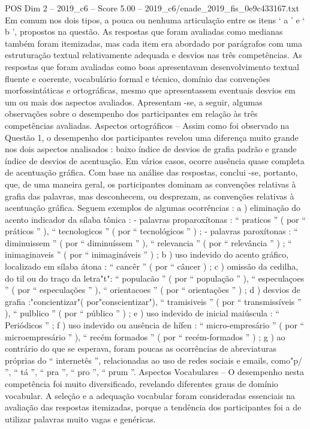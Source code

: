 \begin{textsample}{POS Dim 2 – 2019\_c6 – Score 5.00 – 2019\_c6/enade\_2019\_fis\_0e9c433167.txt}
Em comum nos dois tipos, a pouca ou nenhuma articulação entre os itens ‘ a ’ e ‘ b ’, propostos na questão.
As respostas que foram avaliadas como medianas também foram itemizadas, mas cada item era abordado por parágrafos com uma estruturação textual relativamente adequada e desvios nas três competências.
As respostas que foram avaliadas como boas apresentavam desenvolvimento textual fluente e coerente, vocabulário formal e técnico, domínio das convenções morfossintáticas e ortográficas, mesmo que apresentassem eventuais desvios em um ou mais dos aspectos avaliados.
Apresentam -se, a seguir, algumas observações sobre o desempenho dos participantes em relação às três competências avaliadas.
Aspectos ortográficos – Assim como foi observado na Questão 1, o desempenho dos participantes revelou uma diferença muito grande nos dois aspectos analisados : baixo índice de desvios de grafia padrão e grande índice de desvios de acentuação.
Em vários casos, ocorre ausência quase completa de acentuação gráfica.
Com base na análise das respostas, conclui -se, portanto, que, de uma maneira geral, os participantes dominam as convenções relativas à grafia das palavras, mas desconhecem, ou desprezam, as convenções relativas à acentuação gráfica.
Seguem exemplos de algumas ocorrências : a ) eliminação do acento indicador da sílaba tônica : - palavras proparoxítonas : “ praticos ” ( por “ práticos ” ), “ tecnologicos ” ( por “ tecnológicos ” ) ; - palavras paroxítonas : “ diminuissem ” ( por “ diminuíssem ” ), “ relevancia ” ( por “ relevância ” ) ; “ inimaginaveis ” ( por “ inimagináveis ” ) ; b ) uso indevido do acento gráfico, localizado em sílaba átona : “ cancêr ” ( por “ câncer ) ; c ) omissão da cedilha, do til ou do traço da letra"t": “ populacão ” ( por “ população ” ), “ especulaçoes ” ( por “ especulações ” ), “ orientacoes ” ( por “ orientações ” ) ; d ) desvios de grafia :"concientizar"( por"conscientizar"), “ tramisiveis ” ( por “ transmissíveis ” ), “ pulblico ” ( por “ público ” ) ; e ) uso indevido de inicial maiúscula : “ Periódicos ” ; f ) uso indevido ou ausência de hífen : “ micro-empresário ” ( por “ microempresário ” ), “ recém formados ” ( por “ recém-formados ” ) ; g ) ao contrário do que se esperava, foram poucas as ocorrências de abreviaturas próprias do “ internetês ”, relacionadas ao uso de redes sociais e emails, como"p/ ”, “ tá ”, “ pra ”, “ pro ”, “ prum ”.
Aspectos Vocabulares – O desempenho nesta competência foi muito diversificado, revelando diferentes graus de domínio vocabular.
A seleção e a adequação vocabular foram consideradas essenciais na avaliação das respostas itemizadas, porque a tendência dos participantes foi a de utilizar palavras muito vagas e genéricas.

\end{textsample}
